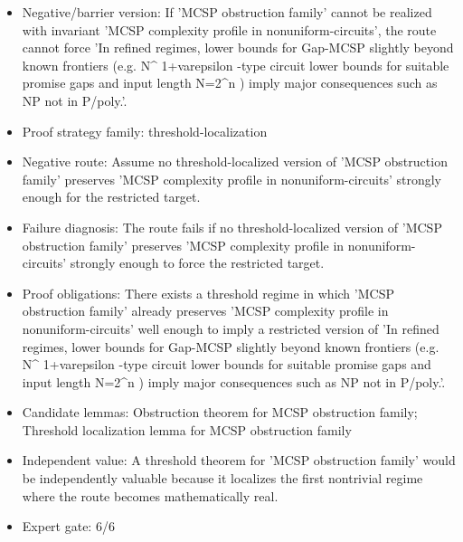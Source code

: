 \documentclass[11pt]{article}
\begin{document}
\begin{itemize}
\item Negative/barrier version: If 'MCSP obstruction family' cannot be realized with invariant 'MCSP complexity profile in nonuniform-circuits', the route cannot force 'In refined regimes, lower bounds for Gap-MCSP slightly beyond known frontiers (e.g. N\textasciicircum{} 1+varepsilon -type circuit lower bounds for suitable promise gaps and input length N=2\textasciicircum{}n ) imply major consequences such as NP not in P/poly.'.
\item Proof strategy family: threshold-localization
\item Negative route: Assume no threshold-localized version of 'MCSP obstruction family' preserves 'MCSP complexity profile in nonuniform-circuits' strongly enough for the restricted target.
\item Failure diagnosis: The route fails if no threshold-localized version of 'MCSP obstruction family' preserves 'MCSP complexity profile in nonuniform-circuits' strongly enough to force the restricted target.
\item Proof obligations: There exists a threshold regime in which 'MCSP obstruction family' already preserves 'MCSP complexity profile in nonuniform-circuits' well enough to imply a restricted version of 'In refined regimes, lower bounds for Gap-MCSP slightly beyond known frontiers (e.g. N\textasciicircum{} 1+varepsilon -type circuit lower bounds for suitable promise gaps and input length N=2\textasciicircum{}n ) imply major consequences such as NP not in P/poly.'.
\item Candidate lemmas: Obstruction theorem for MCSP obstruction family; Threshold localization lemma for MCSP obstruction family
\item Independent value: A threshold theorem for 'MCSP obstruction family' would be independently valuable because it localizes the first nontrivial regime where the route becomes mathematically real.
\item Expert gate: 6/6
\end{itemize}
\end{document}
